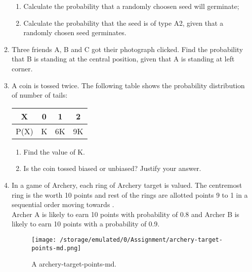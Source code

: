 \documentclass[a4paper,12pt]{article}
\begin{document}
\begin{enumerate}
\begin{enumerate}
\item Calculate the probability that a randomly choosen seed will germinate; 

\item Calculate the probability that the seed is of type A2, given that a randomly chosen seed germinates.

\end{enumerate}
 
\item Three friends A, B and C got their photograph clicked. Find the probability that B is standing at the central position, given that A is standing at left corner. 

\item A coin is tossed twice. The following table shows the probability distribution of number of tails:
\begin{table}[ht]
\centering
\begin{tabular}{|c|c|c|c|}
\hline
X & 0 & 1 & 2 \\
\hline
P(X) & K & 6K & 9K \\
\hline 

\end{tabular}
\end{table}

\begin{enumerate}
\item Find the value of K. 

\item Is the coin tossed biased or unbiased? Justify your answer.

\end{enumerate}

\item In a game of Archery, each ring of Archery target is valued. The centremost ring is the worth 10 points and rest of the rings are allotted points 9 to 1 in a sequential order moving towards .\\
Archer A is likely to earn 10 points with probability of 0.8 and Archer B is likely to earn 10 points with a probability of 0.9.\\

\begin{figure}[h!]
	\centering
  \texttt{[image: /storage/emulated/0/Assignment/archery-target-points-md.png]}
  \caption{A archery-target-points-md.}
  \label{fig:archery-target-points-md}
\end{figure}


\end{enumerate}
\end{document}
